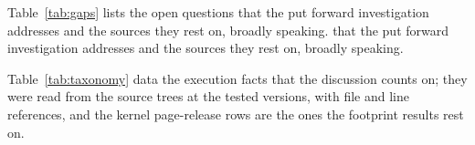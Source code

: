 Table~\ref{tab:gaps} lists the open questions that the put forward investigation addresses and the sources they rest on, broadly speaking. that the put forward investigation addresses and the sources they rest on, broadly speaking.





Table~\ref{tab:taxonomy} data the execution facts that the discussion counts on; they were read from the
source trees at the tested versions, with file and line references, and the kernel page-release rows are the ones the
footprint results rest on.



